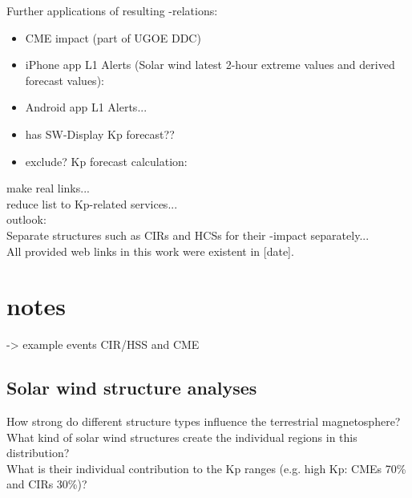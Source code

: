 Further applications of resulting \Kp{}-relations:
\begin{itemize}
	\item CME \Kp{} impact (part of UGOE DDC)
	\item iPhone app L1 Alerts (Solar wind latest 2-hour extreme values and derived forecast values):  
	\item Android app L1 Alerts... 
	\item has SW-Display Kp forecast??
	\item exclude? Kp forecast calculation: 
\end{itemize}

make real links...\\

reduce list to Kp-related services...\\

outlook:\\
Separate structures such as CIRs and HCSs for their \Kp-impact separately...\\

All provided web links in this work were existent in [date].\\



\section{notes}


-> example events CIR/HSS and CME\\



\subsection{Solar wind structure analyses}
How strong do different structure types influence the terrestrial magnetosphere?\\
What kind of solar wind structures create the individual regions in this distribution?\\
What is their individual contribution to the Kp ranges (e.g. high Kp: CMEs 70\% and CIRs 30\%)?\\

